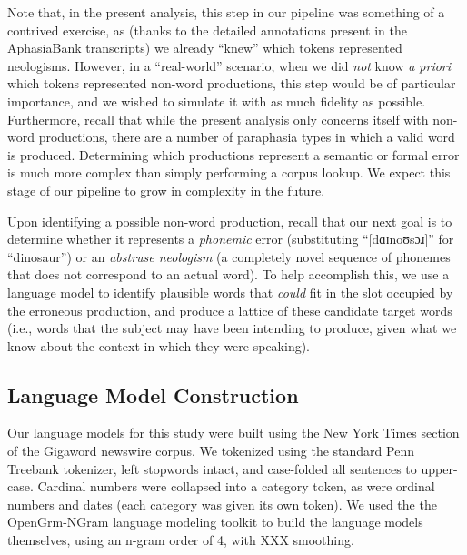 \documentclass[11pt,letterpaper]{article}
\begin{document}
Note that, in the present analysis, this step in our pipeline was something of a contrived exercise, as (thanks to the detailed annotations present in the AphasiaBank transcripts) we already ``knew'' which tokens represented neologisms.
However, in a ``real-world'' scenario, when we did \emph{not} know \emph{a priori} which tokens represented non-word productions, this step would be of particular importance, and we wished to simulate it with as much fidelity as possible.
Furthermore, recall that while the present analysis only concerns itself with non-word productions, there are a number of paraphasia types in which a valid word is produced.
Determining which productions represent a semantic or formal error is much more complex than simply performing a corpus lookup.
We expect this stage of our pipeline to grow in complexity in the future.

Upon identifying a possible non-word production, recall that our next goal is to determine whether it represents a \emph{phonemic} error (substituting ``[dɑɪnoʊsɔɹ]'' for ``dinosaur'') or an \emph{abstruse neologism} (a completely novel sequence of phonemes that does not correspond to an actual word).
To help accomplish this, we use a language model to identify plausible words that \emph{could} fit in the slot occupied by the erroneous production, and produce a lattice of these candidate target words (i.e., words that the subject may have been intending to produce, given what we know about the context in which they were speaking).


\subsection{Language Model Construction} %
\label{sub:language_model_construction}

Our language models for this study were built using the New York Times section of the Gigaword newswire corpus. %
We tokenized using the standard Penn Treebank tokenizer, left stopwords intact, and case-folded all sentences to upper-case.
Cardinal numbers were collapsed into a category token, as were ordinal numbers and dates (each category was given its own token).
We used the the OpenGrm-NGram language modeling toolkit \cite{RoarkOpenGRM} to build the language models themselves, using an n-gram order of 4, with XXX smoothing. %
\end{document}
